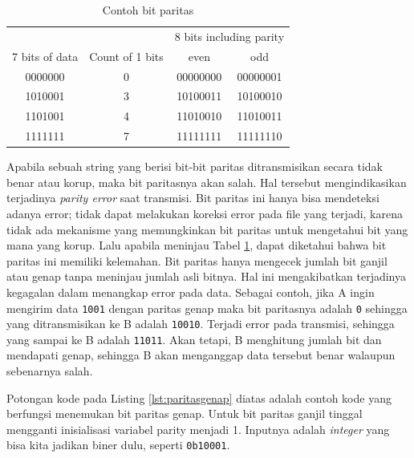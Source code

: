 \begin{table}
  \caption{Contoh bit paritas}
  \label{tab:parityexample}
  \centering
  \begin{tabular}{cccc}
    \toprule
    & & \multicolumn{2}{c}{8 bits including parity} \\
    7 bits of data & Count of 1 bits & even & odd \\
    \midrule
    0000000        & 0               & 00000000 & 00000001 \\
    1010001        & 3               & 10100011 & 10100010 \\
    1101001        & 4               & 11010010 & 11010011 \\
    1111111        & 7               & 11111111 & 11111110 \\
    \bottomrule
  \end{tabular}
\end{table}

Apabila sebuah string yang berisi bit-bit paritas ditransmisikan secara tidak benar atau korup, maka bit paritasnya akan salah. Hal tersebut mengindikasikan terjadinya \emph{parity error} saat transmisi. Bit paritas ini hanya bisa mendeteksi adanya error; tidak dapat melakukan koreksi error pada file yang terjadi, karena tidak ada mekanisme yang memungkinkan bit paritas untuk mengetahui bit yang mana yang korup. Lalu apabila meninjau Tabel \ref{tab:parityexample}, dapat diketahui bahwa bit paritas ini memiliki kelemahan. Bit paritas hanya mengecek jumlah bit ganjil atau genap tanpa meninjau jumlah asli bitnya. Hal ini mengakibatkan terjadinya kegagalan dalam menangkap error pada data. Sebagai contoh, jika A ingin mengirim data \verb|1001| dengan paritas genap maka bit paritasnya adalah \verb|0| sehingga yang ditransmisikan ke B adalah \verb|10010|. Terjadi error pada transmisi, sehingga yang sampai ke B adalah \verb|11011|. Akan tetapi, B menghitung jumlah bit dan mendapati genap, sehingga B akan menganggap data tersebut benar walaupun sebenarnya salah.



Potongan kode pada Listing \ref{lst:paritasgenap} diatas adalah contoh kode yang berfungsi menemukan bit paritas genap. Untuk bit paritas ganjil tinggal mengganti inisialisasi variabel parity menjadi 1. Inputnya adalah \emph{integer} yang bisa kita jadikan biner dulu, seperti \verb|0b10001|.


\lipsum[6-7]

